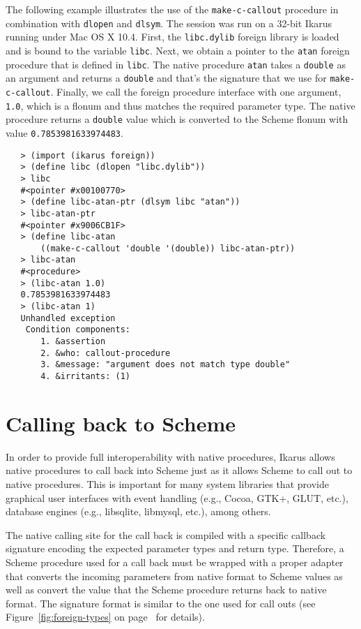 \documentclass[onecolumn, 12pt, twoside, openright, dvipdfm]{book}
\begin{document}
The following example illustrates the use of the
\texttt{make-c-callout} procedure in combination with \texttt{dlopen}
and \texttt{dlsym}.  The session was run on a 32-bit Ikarus running
under Mac OS X 10.4.  First, the \texttt{libc.dylib} foreign library
is loaded and is bound to the variable \texttt{libc}.  Next, we
obtain a pointer to the \texttt{atan} foreign procedure that is
defined in \texttt{libc}.  The native procedure \texttt{atan} takes
a \texttt{double} as an argument and returns a \texttt{double} and
that's the signature that we use for \texttt{make-c-callout}.
Finally, we call the foreign procedure interface with one argument,
\texttt{1.0}, which is a flonum and thus matches the required
parameter type.  The native procedure returns a \texttt{double}
value which is converted to the Scheme flonum with value
\texttt{0.7853981633974483}.

\begin{verbatim}
   > (import (ikarus foreign))
   > (define libc (dlopen "libc.dylib"))
   > libc
   #<pointer #x00100770>
   > (define libc-atan-ptr (dlsym libc "atan"))
   > libc-atan-ptr
   #<pointer #x9006CB1F>
   > (define libc-atan 
       ((make-c-callout 'double '(double)) libc-atan-ptr))
   > libc-atan
   #<procedure>
   > (libc-atan 1.0)
   0.7853981633974483
   > (libc-atan 1)
   Unhandled exception
    Condition components:
       1. &assertion
       2. &who: callout-procedure
       3. &message: "argument does not match type double"
       4. &irritants: (1)
\end{verbatim}


\section{\label{sec:callback}Calling back to Scheme}

In order to provide full interoperability with native procedures,
Ikarus allows native procedures to call back into Scheme just as it
allows Scheme to call out to native procedures.  This is important
for many system libraries that provide graphical user interfaces
with event handling (e.g., Cocoa, GTK+, GLUT, etc.), database
engines (e.g., libsqlite, libmysql, etc.), among others.

The native calling site for the call back is compiled with a
specific callback signature encoding the expected parameter types
and return type.  Therefore, a Scheme procedure used for a call back
must be wrapped with a proper adapter that converts the incoming
parameters from native format to Scheme values as well as convert
the value that the Scheme procedure returns back to native format.
The signature format is similar to the one used for call outs (see
Figure~\ref{fig:foreign-types} on page~\pageref{fig:foreign-types} for
details).
\end{document}
